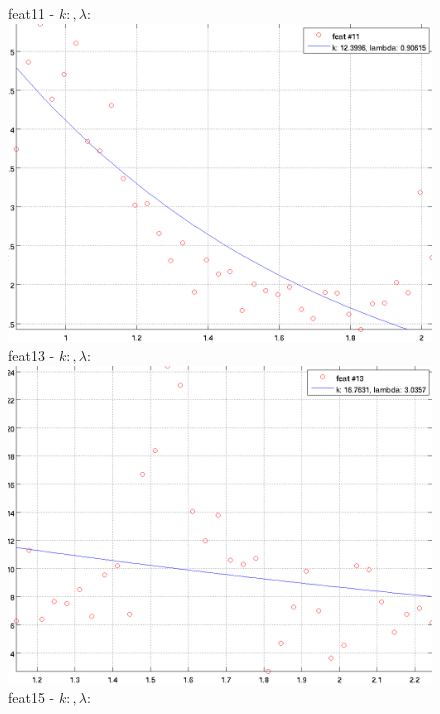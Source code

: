 \documentclass[12pt]{report}
\begin{document}
\begin{figure}[H]
\begin{minipage}[t]{0.5\linewidth}
	\centering
	feat11 - $k: , \lambda:  $\\
	\includegraphics[scale=\imFeat]{images/feat11}\\
	feat13 - $k: , \lambda:  $\\
	\includegraphics[scale=\imFeat]{images/feat13}\\
	feat15 - $k: , \lambda:  $\\

\end{minipage}
\end{figure}
\end{document}
